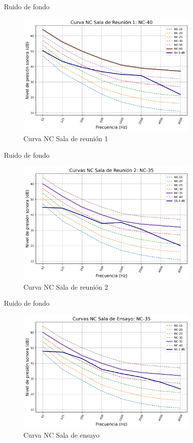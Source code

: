 \documentclass{sintefbeamer}
\begin{document}
\begin{frame}{Ruido de fondo}
\begin{figure}
    \centering
    \includegraphics[width=9cm]{images/Curvas NC/NC reunion 1.png}
    \caption{Curva NC Sala de reunión 1}
    \label{fig:nc-sala1}
\end{figure}
\end{frame}

\begin{frame}{Ruido de fondo}
\begin{figure}
    \centering
    \includegraphics[width=9cm]{images/Curvas NC/NC reunion 2.png}
    \caption{Curva NC Sala de reunión 2}
    \label{fig:nc-sala2}
\end{figure}
    
\end{frame}

\begin{frame}{Ruido de fondo}
\begin{figure}
    \centering
    \includegraphics[width=9cm]{images/Curvas NC/NC ensayo.png}
    \caption{Curva NC Sala de ensayo}
    \label{fig:nc-ensayo}
\end{figure}
\end{frame}
\end{document}
